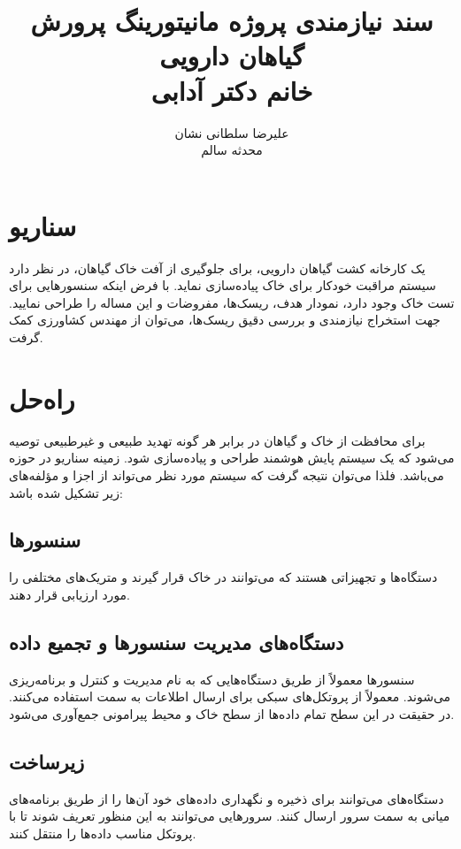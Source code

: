 \documentclass[a4paper]{report}
\title{
    سند نیازمندی پروژه مانیتورینگ پرورش گیاهان دارویی \\
    خانم دکتر آدابی \\ 
    \versionnumber
}
\author{
    علیرضا سلطانی نشان \\
    محدثه سالم \\
}
\begin{document}
\maketitle

\section*{سناریو}

یک کارخانه کشت‌ گیاهان دارویی، برای جلوگیری از آفت خاک گیاهان، در نظر دارد سیستم
مراقبت خودکار برای خاک پیاده‌سازی نماید. با فرض اینکه سنسورهایی برای تست خاک
وجود دارد، نمودار هدف، ریسک‌ها، مفروضات و  این مساله را طراحی نمایید.
جهت استخراج نیازمندی و بررسی دقیق ریسک‌ها، می‌توان از مهندس کشاورزی کمک گرفت.

\section*{راه‌حل}

برای محافظت از خاک و گیاهان در برابر هر گونه تهدید طبیعی و غیرطبیعی توصیه می‌شود
که یک سیستم پایش هوشمند  طراحی و پیاده‌سازی
شود. زمینه سناریو در حوزه  می‌باشد. فلذا می‌توان نتیجه گرفت که سیستم
مورد نظر می‌تواند از اجزا و مؤلفه‌های زیر تشکیل شده باشد:

\subsection*{سنسور‌ها}

دستگاه‌ها و تجهیزاتی هستند که می‌توانند در خاک قرار گیرند و متریک‌های مختلفی را
مورد ارزیابی قرار دهند.

\subsection*{دستگاه‌های مدیریت سنسور‌ها و تجمیع داده}

سنسور‌ها معمولاً از طریق دستگاه‌هایی که به نام  مدیریت و کنترل و
برنامه‌ریزی می‌شوند. معمولاً از پروتکل‌های سبکی برای ارسال اطلاعات به سمت
 استفاده می‌کنند. در حقیقت در این سطح تمام داده‌ها از سطح خاک و محیط
پیرامونی جمع‌آوری می‌شود.

\subsection*{زیرساخت}

دستگا‌ه‌های  می‌توانند برای ذخیره و نگهداری داده‌های خود آن‌ها
را از طریق برنامه‌های میانی به سمت سرور ارسال کنند. سرو‌ر‌هایی می‌توانند به این
منظور تعریف شوند تا با پروتکل مناسب داده‌ها را منتقل کنند.
\end{document}
